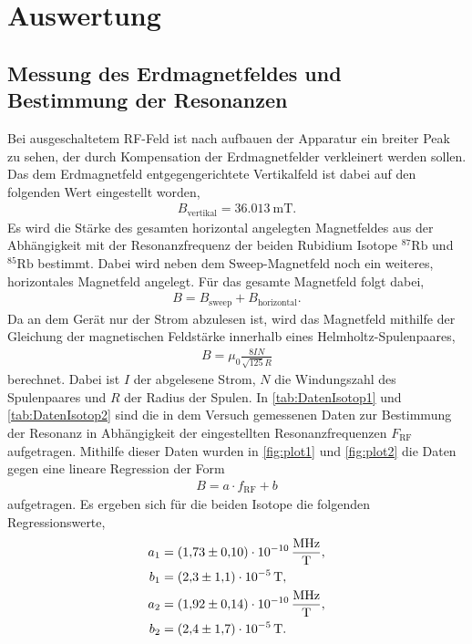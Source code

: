 \section{Auswertung}
\label{sec:Auswertung}

\subsection{Messung des Erdmagnetfeldes und Bestimmung der Resonanzen}
\label{subsec:Erdmagnetfeld}

Bei ausgeschaltetem RF-Feld ist nach aufbauen der Apparatur ein breiter Peak zu sehen, der durch Kompensation der Erdmagnetfelder verkleinert werden sollen.
Das dem Erdmagnetfeld entgegengerichtete Vertikalfeld ist dabei auf den folgenden Wert eingestellt worden,
\begin{align*}
    B_{\text{vertikal}} = \SI{36.013}{\milli\tesla}.
\end{align*}
Es wird die Stärke des gesamten horizontal angelegten Magnetfeldes aus der Abhängigkeit mit der Resonanzfrequenz der beiden Rubidium Isotope $^{87}\text{Rb}$ und $^{85}\text{Rb}$
bestimmt. Dabei wird neben dem Sweep-Magnetfeld noch ein weiteres, horizontales Magnetfeld angelegt. Für das gesamte Magnetfeld folgt dabei,
\begin{align}
    B=B_{\text{sweep}} + B_{\text{horizontal}}.
\end{align}
Da an dem Gerät nur der Strom abzulesen ist, wird das Magnetfeld mithilfe der Gleichung der magnetischen Feldstärke innerhalb eines Helmholtz-Spulenpaares,
\begin{align}
    B=\mu_0\frac{8IN}{\sqrt{125}R}
\end{align}
berechnet. Dabei ist $I$ der abgelesene Strom, $N$ die Windungszahl des Spulenpaares und $R$ der Radius der Spulen.
In \autoref{tab:DatenIsotop1} und \autoref{tab:DatenIsotop2} sind die in dem Versuch gemessenen Daten zur Bestimmung der Resonanz in Abhängigkeit der eingestellten Resonanzfrequenzen
$F_{\text{RF}}$ aufgetragen. Mithilfe dieser Daten wurden in \autoref{fig:plot1} und \autoref{fig:plot2} die Daten gegen eine lineare Regression der Form
\begin{align}
    B=a\cdot f_{\text{RF}} + b
\end{align}
aufgetragen. Es ergeben sich für die beiden Isotope die folgenden Regressionswerte,
\begin{align*}
    a_1 &= \SI{1.73 \pm 0.10 e-10}{\mega\hertz\per\tesla}, \\
    b_1 &= \SI{2.3 \pm 1.1 e-5}{\tesla}, \\
    a_2 &= \SI{1.92 \pm 0.14 e-10}{\mega\hertz\per\tesla}, \\
    b_2 &= \SI{2.4 \pm 1.7 e-5}{\tesla}.
\end{align*}

